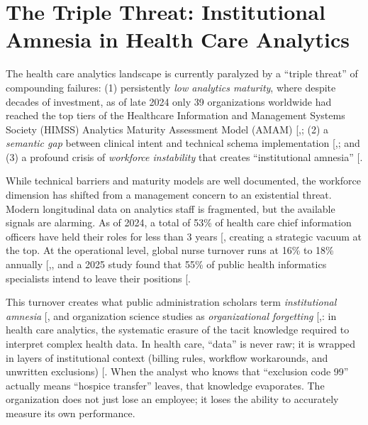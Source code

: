 \documentclass[
  american,
  11pt,
  letterpaper,
  oneside  ,captions=tableheading
]{scrartcl}
\begin{document}
\section{The Triple Threat: Institutional Amnesia in Health Care
Analytics}\label{the-triple-threat-institutional-amnesia-in-health-care-analytics}

The health care analytics landscape is currently paralyzed by a ``triple
threat'' of compounding failures: (1) persistently \emph{low analytics
maturity}, where despite decades of investment, as of late 2024 only 39
organizations worldwide had reached the top tiers of the Healthcare
Information and Management Systems Society (HIMSS) Analytics Maturity
Assessment Model (AMAM)
{[},\citeproc{ref-himss2024news}{2}{]}; (2) a
\emph{semantic gap} between clinical intent and technical schema
implementation
{[},\citeproc{ref-zhang2024}{4}{]}; and (3) a
profound crisis of \emph{workforce instability} that creates
``institutional amnesia'' {[}\citeproc{ref-hong2025}{5}{]}.

While technical barriers and maturity models are well documented, the
workforce dimension has shifted from a management concern to an
existential threat. Modern longitudinal data on analytics staff is
fragmented, but the available signals are alarming. As of 2024, a total
of 53\% of health care chief information officers have held their roles
for less than 3 years {[}\citeproc{ref-wittkieffer2024}{6}{]}, creating
a strategic vacuum at the top. At the operational level, global nurse
turnover runs at 16\% to 18\% annually
{[},\citeproc{ref-wu2024}{8}{]}, and a 2025
study found that 55\% of public health informatics specialists intend to
leave their positions {[}\citeproc{ref-rajamani2025}{9}{]}.

This turnover creates what public administration scholars term
\emph{institutional amnesia}
{[},\citeproc{ref-stark2019}{11}{]} and
organization science studies as \emph{organizational forgetting}
{[},\citeproc{ref-rao2006}{13}{]}: in
health care analytics, the systematic erasure of the tacit knowledge
required to interpret complex health data. In health care, ``data'' is
never raw; it is wrapped in layers of institutional context (billing
rules, workflow workarounds, and unwritten exclusions)
{[}\citeproc{ref-gitelman2013}{14}{]}. When the analyst who knows that
``exclusion code 99'' actually means ``hospice transfer'' leaves, that
knowledge evaporates. The organization does not just lose an employee;
it loses the ability to accurately measure its own performance.
\end{document}
